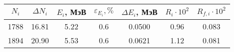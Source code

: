 \begin{tabular}{ccccccc}
\toprule
$N_i$ & $\Delta N_i$ & $E_i$, МэВ & $\varepsilon_{E_i}, \%$ & $\Delta E_i$, МэВ & $R_i \cdot 10^2$ & $R_{f,i} \cdot 10^2$ \\
\midrule
1788 & 16.81 & 5.22 & 0.6 & 0.0500 & 0.96 & 0.083 \\
1894 & 20.90 & 5.53 & 0.6 & 0.0621 & 1.12 & 0.081 \\
\bottomrule
\end{tabular}
